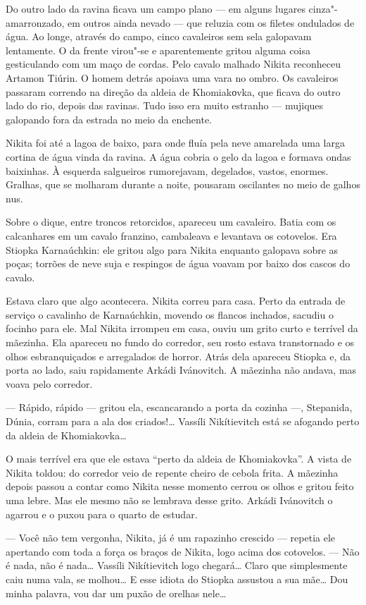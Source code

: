 Do outro lado da ravina ficava um campo plano --- em alguns lugares
cinza"-amarronzado, em outros ainda nevado --- que reluzia com os filetes
ondulados de água. Ao longe, através do campo, cinco cavaleiros sem sela
galopavam lentamente. O da frente virou"-se e aparentemente gritou alguma
coisa gesticulando com um maço de cordas. Pelo cavalo malhado Nikita
reconheceu Artamon Tiúrin. O homem detrás apoiava uma vara no ombro. Os
cavaleiros passaram correndo na direção da aldeia de Khomiakоvka, que
ficava do outro lado do rio, depois das ravinas. Tudo isso era muito
estranho --- mujiques galopando fora da estrada no meio da enchente.

Nikita foi até a lagoa de baixo, para onde fluía pela neve amarelada uma
larga cortina de água vinda da ravina. A água cobria o gelo da lagoa e
formava ondas baixinhas. À esquerda salgueiros rumorejavam, degelados,
vastos, enormes. Gralhas, que se molharam durante a noite, pousaram
oscilantes no meio de galhos nus.

Sobre o dique, entre troncos retorcidos, apareceu um cavaleiro.
Batia com os calcanhares em um cavalo franzino, cambaleava e levantava
os cotovelos. Era Stiopka Karnaúchkin: ele gritou algo para Nikita
enquanto galopava sobre as poças; torrões de neve suja e respingos de
água voavam por baixo dos cascos do cavalo.

Estava claro que algo acontecera. Nikita correu para casa. Perto da
entrada de serviço o cavalinho de Karnaúchkin, movendo os flancos
inchados, sacudiu o focinho para ele. Mal  Nikita irrompeu em casa, ouviu
um grito curto e terrível da mãezinha. Ela apareceu no fundo do
corredor, seu rosto estava transtornado e os olhos esbranquiçados e
arregalados de horror. Atrás dela apareceu Stiopka e, da porta ao lado,
saiu rapidamente Arkádi Ivánovitch. A mãezinha não andava, mas
voava pelo corredor.

--- Rápido, rápido --- gritou ela, escancarando a porta da cozinha ---,
Stepanida, Dúnia, corram para a ala dos criados!\ldots{} Vassíli Nikítievitch
está se afogando perto da aldeia de Khomiakovka\ldots{}

O mais terrível era que ele estava ``perto da aldeia de Khomiakovka''. A
vista de Nikita toldou: do corredor veio de repente cheiro de cebola
frita. A mãezinha depois passou a contar como Nikita nesse momento
cerrou os olhos e gritou feito uma lebre. Mas ele mesmo não se lembrava
desse grito. Arkádi Ivánovitch o agarrou e o puxou para o quarto de
estudar.

--- Você não tem vergonha, Nikita, já é um rapazinho crescido ---
repetia ele apertando com toda a força os braços de Nikita, logo acima
dos cotovelos. --- Não é nada, não é nada\ldots{} Vassíli Nikítievitch logo
chegará\ldots{} Claro que simplesmente caiu numa vala, se molhou\ldots{} E esse
idiota do Stiopka assustou a sua mãe\ldots{} Dou minha palavra, vou dar um
puxão de orelhas nele\ldots{}

